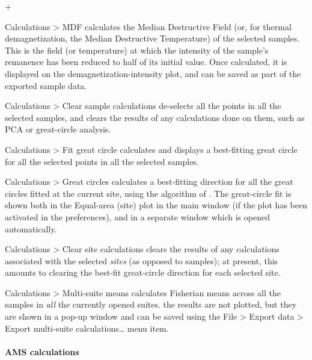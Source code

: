 \documentclass[a4paper,british]{article}
\newcommand{\menuitemlabel}[1]{%
\mbox{\textsf{#1}}\hfil}
\newenvironment{menuitemlist}%
{\begin{list}{}{%
\renewcommand{\makelabel}{\menuitemlabel}%
\setlength{\labelwidth}{35pt}%
\setlength{\leftmargin}%
             {\labelwidth+\labelsep}}}%
{\end{list}}
\newcommand{\ppcmd}[1]{\textsf{#1}} %
\newcommand{\caps}[1]{\MakeTextUppercase{#1}} %
\newcommand{\submenu}{ \textgreater{} } %
\begin{document}
\begin{menuitemlist}
\item[Calculations\submenu MDF] calculates the Median Destructive Field (or,
  for thermal demagnetization, the Median Destructive Temperature) of the
  selected samples. This is the field (or temperature) at which the intensity
  of the sample's remanence has been reduced to half of its initial value.
  Once calculated, it is displayed on the demagnetization-intensity plot, and
  can be saved as part of the exported sample data.

\item[Calculations\submenu Clear sample calculations] de-selects all the
  points in all the selected samples, and clears the results of any
  calculations done on them, such as \caps{pca} or great-circle analysis.

\item[Calculations\submenu Fit great circle] calculates and displays a
  best-fitting great circle for all the selected points in all the selected
  samples.

\item[Calculations\submenu Great circles] calculates a best-fitting direction
  for all the great circles fitted at the current site, using the algorithm
  of \cite{mcfadden1988circles}. The great-circle fit is shown both in the
  \ppcmd{Equal-area (site)} plot in the main window (if the plot has been
  activated in the preferences), and in a separate window which is opened
  automatically.

\item[Calculations\submenu Clear site calculations] clears the
results of any calculations associated with the selected {\em sites}
(as opposed to samples); at present, this amounts to clearing the
best-fit great-circle direction for each selected site.

\item[Calculations\submenu Multi-suite means] calculates Fisherian means
  across all the samples in \emph{all} the currently opened suites. the
  results are not plotted, but they are shown in a pop-up window and can be
  saved using the \ppcmd{File\submenu Export data\submenu Export multi-suite
    calculations\ldots} menu item.

\end{menuitemlist}

\paragraph{\caps{Ams} calculations}
\end{document}
